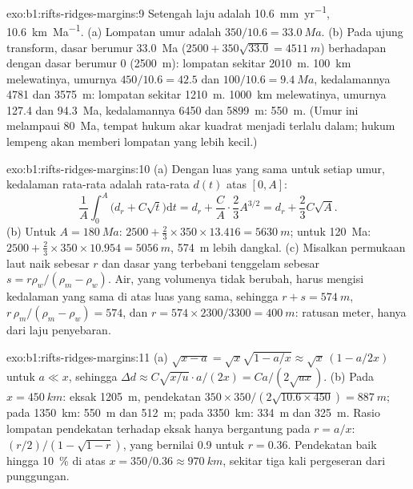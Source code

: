 \begin{solution}{exo:b1:rifts-ridges-margins:9}
Setengah laju adalah \qty{10.6}{mm.yr^{-1}}, \qty{10.6}{km.Ma^{-1}}. (a) Lompatan umur
adalah $350/10.6 = \qty{33.0}{Ma}$. (b) Pada ujung transform, dasar
berumur \qty{33.0}{Ma} ($2500 + 350\sqrt{33.0} = \qty{4511}{m}$) berhadapan dengan dasar
berumur 0 (\qty{2500}{m}): lompatan sekitar \qty{2010}{m}. \qty{100}{km} melewatinya,
umurnya $450/10.6 = 42.5$ dan $100/10.6 = \qty{9.4}{Ma}$, kedalamannya
4781 dan \qty{3575}{m}: lompatan sekitar \qty{1210}{m}. \qty{1000}{km} melewatinya,
umurnya 127.4 dan \qty{94.3}{Ma}, kedalamannya 6450 dan \qty{5899}{m}:
\qty{550}{m}. (Umur ini melampaui \qty{80}{Ma}, tempat hukum akar kuadrat menjadi
terlalu dalam; hukum lempeng akan memberi lompatan yang lebih kecil.)
\end{solution}

\begin{solution}{exo:b1:rifts-ridges-margins:10}
(a) Dengan luas yang sama untuk setiap umur, kedalaman rata-rata adalah rata-rata $d(t)$ atas
$[0, A]$:
\[
  \frac1A\int_0^A\bigl(d_r + C\sqrt t\bigr)\mathrm dt = d_r + \frac CA\cdot\frac23A^{3/2}
  = d_r + \frac23C\sqrt A.
\]
(b) Untuk $A = \qty{180}{Ma}$: $2500 + \frac23\times350\times13.416 =
\qty{5630}{m}$; untuk \qty{120}{Ma}: $2500 + \frac23\times350\times10.954 =
\qty{5056}{m}$, \qty{574}{m} lebih dangkal. (c) Misalkan permukaan laut naik sebesar $r$ dan
dasar yang terbebani tenggelam sebesar $s = r\rho_w/(\rho_m - \rho_w)$. Air, yang volumenya
tidak berubah, harus mengisi kedalaman yang sama di atas luas yang sama, sehingga
$r + s = \qty{574}{m}$, $r\,\rho_m/(\rho_m - \rho_w) = 574$, dan $r = 574\times2300/3300 =
\qty{400}{m}$: ratusan meter, hanya dari laju penyebaran.
\end{solution}

\begin{solution}{exo:b1:rifts-ridges-margins:11}
(a) $\sqrt{x - a} = \sqrt x\sqrt{1 - a/x} \approx \sqrt x\,(1 - a/2x)$ untuk
$a \ll x$, sehingga
$\Delta d \approx C\sqrt{x/u}\cdot a/(2x) = Ca/(2\sqrt{ux})$.
(b) Pada $x = \qty{450}{km}$: eksak \qty{1205}{m}, pendekatan
$350\times350/(2\sqrt{10.6\times450}) = \qty{887}{m}$; pada \qty{1350}{km}:
\qty{550}{m} dan \qty{512}{m}; pada \qty{3350}{km}: \qty{334}{m} dan
\qty{325}{m}. Rasio lompatan pendekatan terhadap eksak hanya bergantung pada
$r = a/x$: $(r/2)/(1 - \sqrt{1 - r})$, yang bernilai 0.9 untuk $r = 0.36$. Pendekatan
baik hingga \qty{10}{\percent} di atas $x = 350/0.36 \approx
\qty{970}{km}$, sekitar tiga kali pergeseran dari punggungan.
\end{solution}

